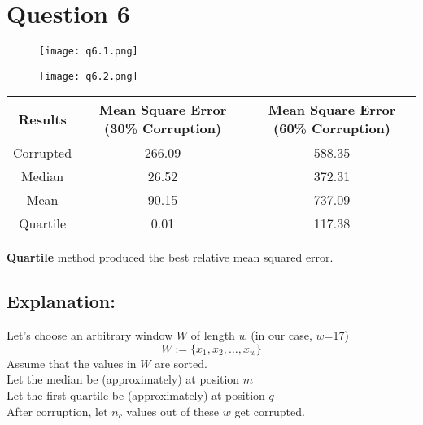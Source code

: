 \documentclass[11pt]{article}
\begin{document}
\section*{Question 6}
\begin{figure}[H]
    \centering
    \texttt{[image: q6.1.png]}
\end{figure}
\begin{figure}[H]
    \centering
    \texttt{[image: q6.2.png]}
\end{figure}
\begin{center}
    \begin{tabular}{|c|c|c|}
        \hline
        \textbf{Results} & \textbf{Mean Square Error (30\% Corruption)} & \textbf{Mean Square Error (60\% Corruption)} \\
        \hline
        Corrupted        & 266.09                                       & 588.35                                       \\
        \hline
        Median           & 26.52                                        & 372.31                                       \\
        \hline
        Mean             & 90.15                                        & 737.09                                       \\
        \hline
        Quartile         & 0.01                                         & 117.38                                       \\
        \hline
    \end{tabular}
\end{center}

\textbf{Quartile} method produced the best relative mean squared error.
\subsection*{Explanation:}
Let's choose an arbitrary window $W$ of length $w$ (in our case, $w$=17)
$$ W := \{ x_1, x_2, \ldots, x_w \} $$
Assume that the values in $W$ are sorted.\\
Let the median be (approximately) at position $m$\\
Let the first quartile be (approximately) at position $q$\\
After corruption, let $n_c$ values out of these $w$ get corrupted.
\end{document}
